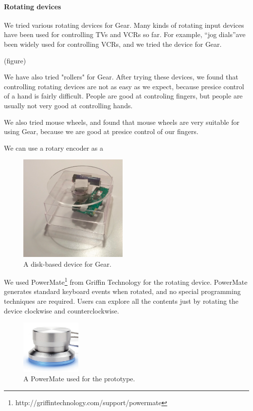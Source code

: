 \documentclass{article}
\begin{document}
\paragraph{Rotating devices}

We tried various rotating devices for Gear.
Many kinds of rotating input devices have been used for controlling TVs and VCRs so far.
For example, ``jog dials''ave been widely used for controlling VCRs, and we tried the device for Gear.

(figure)

We have also tried "rollers" for Gear.
After trying these devices, we found that controlling rotating devices are not as easy as we expect,
because presice control of a hand is fairly difficult.
People are good at controling fingers, but people are usually not very good at controlling hands.

We also tried mouse wheels, and found that mouse wheels are very suitable for using Gear, because
we are good at presice control of our fingers.


We can use a rotary encoder as a 

\begin{figure}[H]
\centerline{\includegraphics[width=54mm,bb=0 0 362 354]{figures/ff2d18e66f9a4655dbb5e22e0bb9a0ae.png}}
\caption{A disk-based device for Gear.}
\label{disk}
\end{figure}

We used
PowerMate\footnote{
  \textsf{http://griffintechnology.com/support/powermate}
} from Griffin Technology for the rotating device.
PowerMate generates standard keyboard events when rotated,
and no special programming techniques are required.
%
Users can explore all the contents just by
rotating the device clockwise and counterclockwise.

\begin{figure}[H]
\centerline{\includegraphics[width=30mm,bb=0 0 389 348]{figures/d3a69499f7e7314ae6dc10f5bf3a2be5.png}}
\caption{A PowerMate used for the prototype.}
\label{powermate}
\end{figure}
\end{document}
